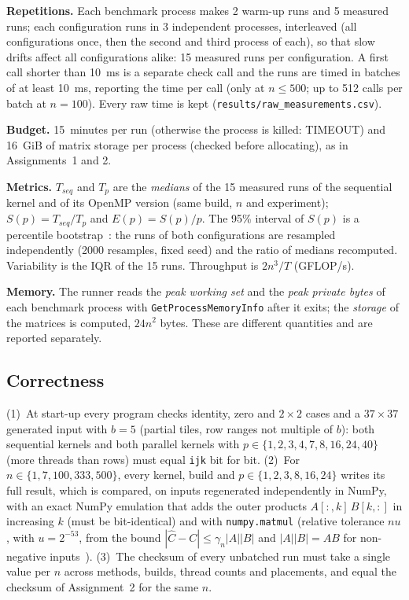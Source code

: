\documentclass[11pt,a4paper]{article}
\begin{document}
\textbf{Repetitions.} Each benchmark process makes 2 warm-up runs and 5 measured runs; each
configuration runs in 3 independent processes, interleaved (all configurations once, then
the second and third process of each), so that slow drifts affect all configurations alike:
15 measured runs per configuration. A first call shorter than 10~ms is a separate check
call and the runs are timed in batches of at least 10~ms, reporting the time per call (only
at $n \le 500$; up to 512 calls per batch at $n = 100$). Every raw time is kept
(\texttt{results/raw\_measurements.csv}).

\textbf{Budget.} 15~minutes per run (otherwise the process is killed: TIMEOUT) and 16~GiB of
matrix storage per process (checked before allocating), as in Assignments~1 and 2.

\textbf{Metrics.} $T_{seq}$ and $T_p$ are the \textit{medians} of the 15 measured runs of the
sequential kernel and of its OpenMP version (same build, $n$ and experiment);
$S(p) = T_{seq}/T_p$ and $E(p) = S(p)/p$. The 95\% interval of $S(p)$ is a percentile
bootstrap~\cite{efron1993}: the runs of both configurations are resampled independently
(2000 resamples, fixed seed) and the ratio of medians recomputed. Variability is the IQR of
the 15 runs. Throughput is $2n^3/T$ (GFLOP/s).

\textbf{Memory.} The runner reads the \textit{peak working set} and the \textit{peak private
bytes} of each benchmark process with \texttt{GetProcessMemoryInfo} after it exits; the
\textit{storage} of the matrices is computed, $24n^2$ bytes. These are different quantities
and are reported separately.

\subsection{Correctness}

(1)~At start-up every program checks identity, zero and $2 \times 2$ cases and a
$37 \times 37$ generated input with $b = 5$ (partial tiles, row ranges not multiple of $b$):
both sequential kernels and both parallel kernels with $p \in \{1, 2, 3, 4, 7, 8, 16, 24,
40\}$ (more threads than rows) must equal \texttt{ijk} bit for bit. (2)~For
$n \in \{1, 7, 100, 333, 500\}$, every kernel, build and $p \in \{1, 2, 3, 8, 16, 24\}$
writes its full result, which is compared, on inputs regenerated independently in NumPy,
with an exact NumPy emulation that adds the outer products $A[:,k]\,B[k,:]$ in increasing $k$
(must be bit-identical) and with \texttt{numpy.matmul} (relative tolerance $n u$, with
$u = 2^{-53}$, from the bound $|\hat{C} - C| \le \gamma_n |A||B|$ and $|A||B| = AB$ for
non-negative inputs~\cite{higham2002}). (3)~The checksum of every unbatched run must take a
single value per $n$ across methods, builds, thread counts and placements, and equal the
checksum of Assignment~2 for the same $n$.
\end{document}
